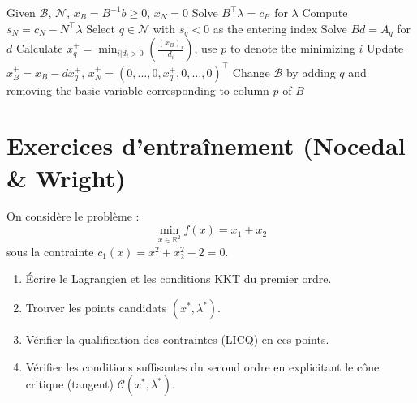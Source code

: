 \begin{algorithm}[H]
\caption{Une étape de la méthode du Simplexe}
\label{alg:simplex}
Given $\mathcal{B}$, $\mathcal{N}$, $x_B = B^{-1}b \ge 0$, $x_N = 0$\;
Solve $B^\top\lambda = c_B$ for $\lambda$\;
Compute $s_N = c_N - N^\top\lambda$\; 
Select $q \in \mathcal{N}$ with $s_q < 0$ as the entering index\;
Solve $Bd = A_q$ for $d$\;
Calculate $x_q^+ = \min_{i|d_i>0}\left(\frac{(x_B)_i}{d_i}\right)$, use $p$ to denote the minimizing $i$\;
Update $x_B^+ = x_B - dx_q^+$, $x_N^+ = (0, \ldots, 0, x_q^+, 0, \ldots, 0)^\top$\;
Change $\mathcal{B}$ by adding $q$ and removing the basic variable corresponding to column $p$ of $B$\;
\end{algorithm}


\section{Exercices d'entraînement (Nocedal \& Wright)}
\label{sec:8.exercises}

\bigskip
\begin{exercice}
On considère le problème :
$$ \min_{x \in \mathbb{R}^2} f(x) = x_1 + x_2 $$
sous la contrainte $c_1(x) = x_1^2 + x_2^2 - 2 = 0$.
\begin{enumerate}
    \item Écrire le Lagrangien et les conditions KKT du premier ordre.
    \item Trouver les points candidats $(x^*, \lambda^*)$.
    \item Vérifier la qualification des contraintes (LICQ) en ces points.
    \item Vérifier les conditions suffisantes du second ordre en explicitant le cône critique (tangent) $\mathcal{C}(x^*, \lambda^*)$.
\end{enumerate}
\end{exercice}

